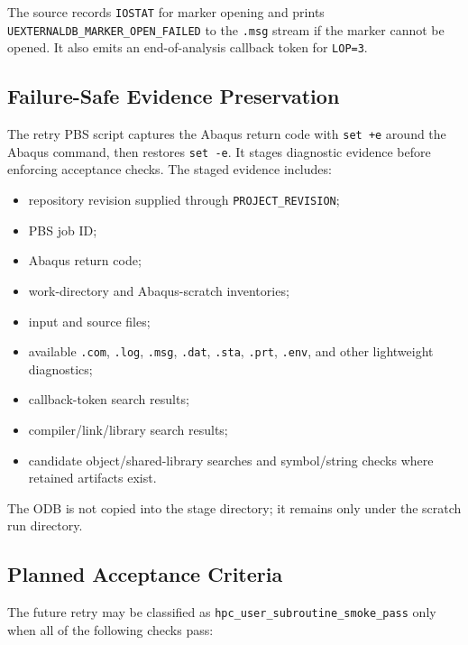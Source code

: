 \documentclass[11pt,a4paper]{article}
\begin{document}
The source records \texttt{IOSTAT} for marker opening and prints \texttt{UEXTERNALDB\_MARKER\_OPEN\_FAILED} to the \texttt{.msg} stream if the marker cannot be opened. It also emits an end-of-analysis callback token for \texttt{LOP=3}.

\subsection*{Failure-Safe Evidence Preservation}

The retry PBS script captures the Abaqus return code with \texttt{set +e} around the Abaqus command, then restores \texttt{set -e}. It stages diagnostic evidence before enforcing acceptance checks. The staged evidence includes:

\begin{itemize}
  \item repository revision supplied through \texttt{PROJECT\_REVISION};
  \item PBS job ID;
  \item Abaqus return code;
  \item work-directory and Abaqus-scratch inventories;
  \item input and source files;
  \item available \texttt{.com}, \texttt{.log}, \texttt{.msg}, \texttt{.dat}, \texttt{.sta}, \texttt{.prt}, \texttt{.env}, and other lightweight diagnostics;
  \item callback-token search results;
  \item compiler/link/library search results;
  \item candidate object/shared-library searches and symbol/string checks where retained artifacts exist.
\end{itemize}

The ODB is not copied into the stage directory; it remains only under the scratch run directory.

\subsection*{Planned Acceptance Criteria}

The future retry may be classified as \texttt{hpc\_user\_subroutine\_smoke\_pass} only when all of the following checks pass:
\end{document}
